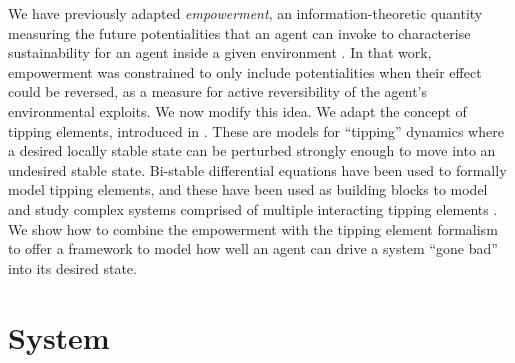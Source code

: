 \documentclass[conference]{IEEEtran}
\begin{document}
We have previously adapted \emph{empowerment}, an
information-theoretic quantity measuring the future potentialities
that an agent can invoke to characterise sustainability for an agent
inside a given environment \cite{Kim2009_sustainability}. In that
work, empowerment was constrained to only include potentialities when
their effect could be reversed, as a measure for active reversibility
of the agent's environmental exploits. We now modify this idea. We
adapt the concept of tipping elements, introduced in
\cite{Lenton2008_tippingelements}. These are models for ``tipping''
dynamics where a desired locally stable state can be perturbed strongly
enough to move into an undesired stable state.  Bi-stable differential
equations have been used to formally model tipping elements, and these
have been used as building blocks to model and study complex systems
comprised of multiple interacting tipping elements
\cite{Brummitt2015_coupledcatastrophes,Klose2019_interactingtippingelements}.
We show how to combine the empowerment with the tipping element
formalism to offer a framework to model how well an agent can drive a
system ``gone bad'' into its desired state.





\section{System}
\end{document}
